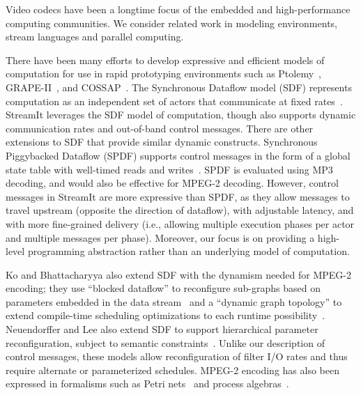 \vspace{-2pt}
\vspace{-7pt}


Video codecs have been a longtime focus of the embedded
and high-performance computing communities.  We consider related work
in modeling environments, stream languages and parallel computing.

There have been many efforts to develop expressive and efficient
models of computation for use in rapid prototyping environments such
as Ptolemy~\cite{ptolemy03overview}, GRAPE-II~\cite{grape-ii}, and
COSSAP~\cite{cossap}.  The Synchronous Dataflow model (SDF) represents
computation as an independent set of actors that communicate at fixed
rates~\cite{lee87static}.  StreamIt leverages the SDF model of
computation, though also supports dynamic communication rates and
out-of-band control messages.  There are other extensions to SDF that
provide similar dynamic constructs.  Synchronous Piggybacked Dataflow
(SPDF) supports control messages in the form of a global state table
with well-timed reads and writes~\cite{park99spdf2,park02spdf3}.  SPDF
is evaluated using MP3 decoding, and would also be effective for
MPEG-2 decoding.  However, control messages in StreamIt are more
expressive than SPDF, as they allow messages to travel upstream
(opposite the direction of dataflow), with adjustable latency, and
with more fine-grained delivery (i.e., allowing multiple execution
phases per actor and multiple messages per phase).  Moreover, our
focus is on providing a high-level programming abstraction rather than
an underlying model of computation.

Ko and Bhattacharyya also extend SDF with the dynamism needed for
MPEG-2 encoding; they use ``blocked dataflow'' to reconfigure
sub-graphs based on parameters embedded in the data
stream~\cite{bhatta05block} and a ``dynamic graph topology'' to extend
compile-time scheduling optimizations to each runtime
possibility~\cite{ko05dgt}. Neuendorffer and Lee also extend SDF to
support hierarchical parameter reconfiguration, subject to semantic
constraints~\cite{neuendorffer04hierarchical}.  Unlike our description
of control messages, these models allow reconfiguration of filter I/O
rates and thus require alternate or parameterized schedules.  MPEG-2
encoding has also been expressed in formalisms such as Petri
nets~\cite{valero02petri} and process algebras~\cite{pelayo01rosa}.

